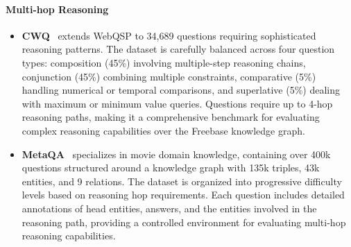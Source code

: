 \documentclass[lettersize,journal]{IEEEtran}
\begin{document}
\paragraph{Multi-hop Reasoning}
\begin{itemize}
    \item \textbf{CWQ}~\cite{talmor2018web} extends WebQSP to 34,689 questions requiring sophisticated reasoning patterns. The dataset is carefully balanced across four question types: composition (45\%) involving multiple-step reasoning chains, conjunction (45\%) combining multiple constraints, comparative (5\%) handling numerical or temporal comparisons, and superlative (5\%) dealing with maximum or minimum value queries. Questions require up to 4-hop reasoning paths, making it a comprehensive benchmark for evaluating complex reasoning capabilities over the Freebase knowledge graph.
    \item \textbf{MetaQA}~\cite{zhang2018variational} specializes in movie domain knowledge, containing over 400k questions structured around a knowledge graph with 135k triples, 43k entities, and 9 relations. The dataset is organized into progressive difficulty levels based on reasoning hop requirements. Each question includes detailed annotations of head entities, answers, and the entities involved in the reasoning path, providing a controlled environment for evaluating multi-hop reasoning capabilities.
\end{itemize}
\end{document}

